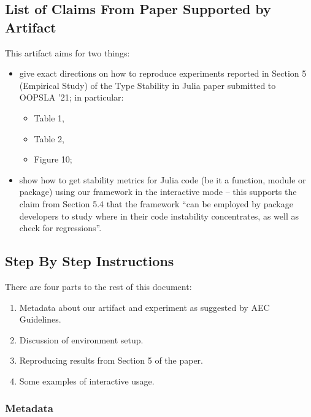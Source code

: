 \documentclass[
]{article}
\providecommand{\tightlist}{%
  \setlength{\itemsep}{0pt}\setlength{\parskip}{0pt}}
\begin{document}
\hypertarget{list-of-claims-from-paper-supported-by-artifact}{%
\subsection{List of Claims From Paper Supported by
Artifact}\label{list-of-claims-from-paper-supported-by-artifact}}

This artifact aims for two things:

\begin{itemize}
\item
  give exact directions on how to reproduce experiments reported in
  Section 5 (Empirical Study) of the Type Stability in Julia paper
  submitted to OOPSLA '21; in particular:

  \begin{itemize}
  \tightlist
  \item
    Table 1,
  \item
    Table 2,
  \item
    Figure 10;
  \end{itemize}
\item
  show how to get stability metrics for Julia code (be it a function,
  module or package) using our framework in the interactive mode -- this
  supports the claim from Section 5.4 that the framework ``can be
  employed by package developers to study where in their code
  instability concentrates, as well as check for regressions''.
\end{itemize}

\hypertarget{step-by-step-instructions}{%
\subsection{Step By Step Instructions}\label{step-by-step-instructions}}

There are four parts to the rest of this document:

\begin{enumerate}
\def\labelenumi{\arabic{enumi}.}
\item
  Metadata about our artifact and experiment as suggested by AEC
  Guidelines.
\item
  Discussion of environment setup.
\item
  Reproducing results from Section 5 of the paper.
\item
  Some examples of interactive usage.
\end{enumerate}

\hypertarget{metadata}{%
\subsubsection{Metadata}\label{metadata}}
\end{document}
